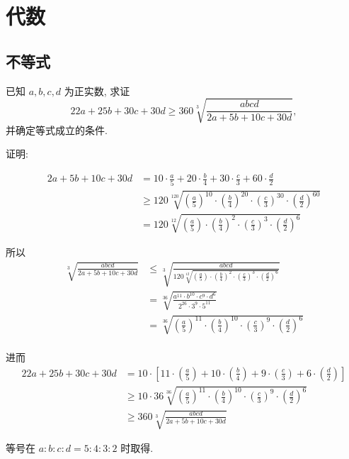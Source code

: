 \chapter{代数}

\section{不等式}

已知 $a,b,c,d$ 为正实数, 求证
\[22a + 25b + 30c + 30d \ge 360 \sqrt[3]{\frac{abcd}{2a+5b+10c+30d}},\]
并确定等式成立的条件.

证明: 

\begin{align*}
2a+5b+10c+30d &=10\cdot\frac{a}{5}+20\cdot\frac{b}{4}+30\cdot\frac{c}{3}+60\cdot\frac{d}{2} \\
& \ge 120\sqrt[120]{\left(\frac{a}{5}\right)^{10}\cdot\left(\frac{b}{4}\right)^{20}\cdot\left(\frac{c}{3}\right)^{30}\cdot\left(\frac{d}{2}\right)^{60}}\\
&= 120\sqrt[12]{\left(\frac{a}{5}\right)\cdot\left(\frac{b}{4}\right)^2\cdot\left(\frac{c}{3}\right)^3\cdot\left(\frac{d}{2}\right)^6}
\end{align*}

所以
\begin{align*}
\sqrt[3]{\frac{abcd}{2a+5b+10c+30d}} &\le \sqrt[3]{\frac{abcd}{120\sqrt[12]{(\frac{a}{5})\cdot(\frac{b}{4})^2\cdot(\frac{c}{3})^3\cdot(\frac{d}{2})^6}}} \\
&= \sqrt[36]{\frac{a^{11}\cdot b^{10}\cdot c^9\cdot d^6}{2^{26}\cdot 3^9\cdot 5^{11}}} \\
&= \sqrt[36]{\left(\frac{a}{5}\right)^{11}\cdot\left(\frac{b}{4}\right)^{10}\cdot\left(\frac{c}{3}\right)^{9}\cdot\left(\frac{d}{2}\right)^6}\\
\end{align*}

进而
\begin{align*}
22a+25b+30c+30d &= 10\cdot\left[11\cdot(\frac{a}{5})+10\cdot(\frac{b}{4})+9\cdot(\frac{c}{3})+6\cdot(\frac{d}{2})\right] \\
&\ge 10\cdot 36\sqrt[36]{\left(\frac{a}{5}\right)^{11}\cdot\left(\frac{b}{4}\right)^{10}\cdot\left(\frac{c}{3}\right)^{9}\cdot\left(\frac{d}{2}\right)^6}\\
&\ge 360 \sqrt[3]{\frac{abcd}{2a+5b+10c+30d}}
\end{align*}

等号在 $a:b:c:d=5:4:3:2$ 时取得.

~
\newpage

